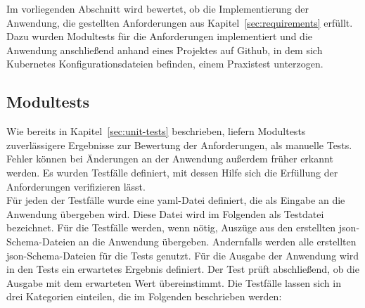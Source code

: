 Im vorliegenden Abschnitt wird bewertet, ob die Implementierung der Anwendung, die gestellten Anforderungen aus Kapitel~\ref{sec:requirements} erfüllt.
Dazu wurden Modultests für die Anforderungen implementiert und die Anwendung anschließend anhand eines Projektes auf Github,
in dem sich Kubernetes Konfigurationsdateien befinden, einem Praxistest unterzogen.

\subsection{Modultests}

Wie bereits in Kapitel~\ref{sec:unit-tests} beschrieben, liefern Modultests zuverlässigere Ergebnisse zur Bewertung der Anforderungen, als manuelle Tests.
Fehler können bei Änderungen an der Anwendung außerdem früher erkannt werden.
Es wurden Testfälle definiert, mit dessen Hilfe sich die Erfüllung der Anforderungen
verifizieren lässt.
\\
Für jeden der Testfälle wurde eine \ac{yaml}-Datei definiert, die als Eingabe an die Anwendung übergeben wird. Diese Datei wird im Folgenden als Testdatei bezeichnet.
Für die Testfälle werden, wenn nötig, Auszüge aus den erstellten \ac{json}-Schema-Dateien an die Anwendung übergeben.
Andernfalls werden alle erstellten \ac{json}-Schema-Dateien für die Tests genutzt.
Für die Ausgabe der Anwendung wird in den Tests ein erwartetes Ergebnis definiert. Der Test prüft abschließend, ob die Ausgabe mit dem erwarteten Wert übereinstimmt.
Die Testfälle lassen sich in drei Kategorien einteilen, die im Folgenden beschrieben werden:


